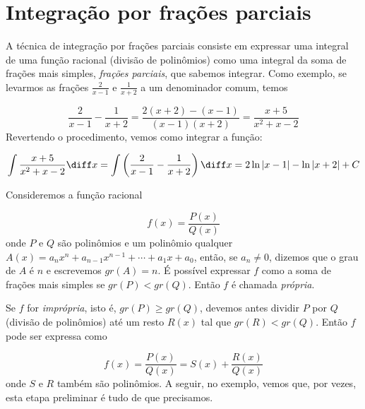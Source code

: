\documentclass[a4paper, 12pt]{extreport}
\begin{document}
  \chapter{\texorpdfstring{Integração por frações parciais}{TEXT}{}}
    A técnica de integração por frações parciais consiste em expressar uma integral de uma função racional (divisão de polinômios)
    como uma integral da soma de frações mais simples, \textsl{frações parciais}, que sabemos integrar. Como exemplo, se levarmos as frações
    $\frac{2}{x-1}$ e $\frac{1}{x+2}$ a um denominador comum, temos

    $$ \frac{2}{x-1} - \frac{1}{x+2} = \frac{2(x+2)-(x-1)}{(x-1)(x+2)} = \frac{x+5}{x^2+x-2}$$
    Revertendo o procedimento, vemos como integrar a função:

    $$ \int{\frac{x+5}{x^2+x-2}\diff x} = \int{\left(\frac{2}{x-1} - \frac{1}{x+2}\right)\diff x} = 2\ln|x-1| - \ln|x+2| + C $$

    Consideremos a função racional

    \begin{equation}
      f(x) = \frac{P(x)}{Q(x)}
    \end{equation}
    onde $P$ e $Q$ são polinômios e um polinômio qualquer $A(x) = a_nx^n + a_{n-1}x^{n-1} + \cdots + a_1x + a_0$, então, se $a_n \neq 0$, dizemos que o grau de $A$
    é $n$ e escrevemos $gr(A) = n$. É possível expressar $f$ como a soma de frações mais simples se $gr(P) < gr(Q)$. Então $f$ é chamada \textsl{própria}.

    Se $f$ for \textsl{imprópria}, isto é, $gr(P) \geqslant gr(Q)$, devemos antes dividir $P$ por $Q$ (divisão de polinômios) até um resto $R(x)$ tal que $gr(R) < gr(Q)$. Então $f$ pode ser expressa como

    \begin{equation}
      f(x) = \frac{P(x)}{Q(x)} = S(x) + \frac{R(x)}{Q(x)}
    \end{equation}
    onde $S$ e $R$ também são polinômios. A seguir, no exemplo, vemos que, por vezes, esta etapa preliminar é tudo de que precisamos.
\end{document}
